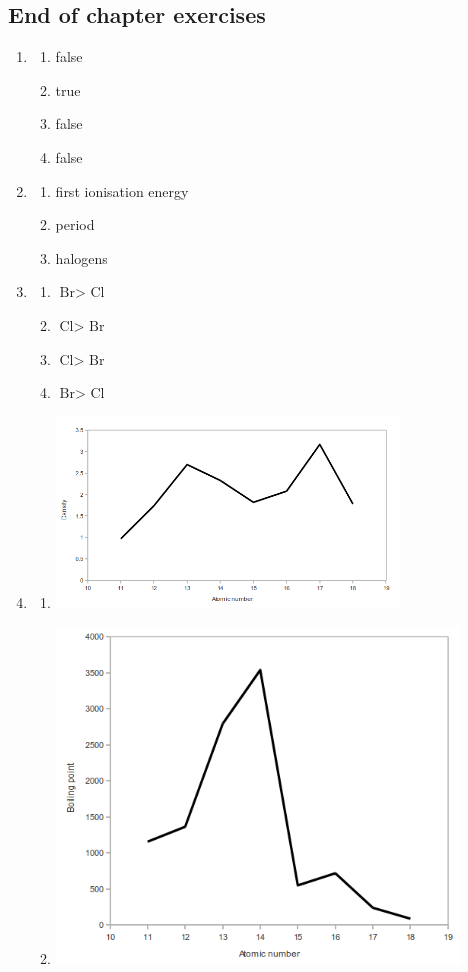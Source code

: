 \subsection{End of chapter exercises} 
\begin{multicols}{3}
    \begin{enumerate}[itemsep=6pt, label=\textbf{\arabic*}. ] 
\item %
 \begin{enumerate}[noitemsep, label=\textbf{(\alph*)} ]
    \item false
    \item true
    \item false
    \item false
    \end{enumerate}
\item %
 \begin{enumerate}[noitemsep, label=\textbf{(\alph*)} ]
    \item first ionisation energy
    \item period
    \item halogens
    \end{enumerate}
\item %
 \begin{enumerate}[noitemsep, label=\textbf{(\alph*)} ] 
    \item $\text{Br} > \text{ Cl}$
    \item $\text{Cl} > \text{ Br}$ 
    \item $\text{Cl} > \text{ Br}$
    \item $\text{Br} > \text{ Cl}$
    \end{enumerate}
\item %
 \begin{enumerate}[noitemsep, label=\textbf{(\alph*)} ]
    \item \includegraphics[width=.2\textwidth]{photos/periodictable_eocex_graph1.png}
    \item \includegraphics[width=.2\textwidth]{photos/periodictable_eocex_graph2.png}

\end{enumerate}
\end{enumerate}
\end{multicols}
